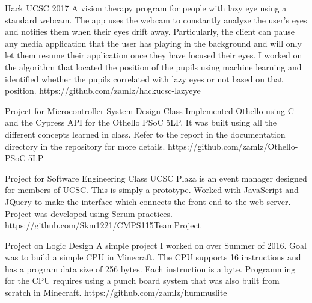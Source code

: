 \documentclass{cv}
\begin{document}
\begin{adjustwidth}{0.5cm}{0.5cm}
{Hack UCSC 2017}
{A vision therapy program for people with lazy eye using a standard
webcam. The app uses the webcam to constantly analyze the user's eyes
and notifies them when their eyes drift away. Particularly, the client
can pause any media application that the user has playing in the
background and will only let them resume their application once they
have focused their eyes. I worked on the algorithm that located the
position of the pupils using machine learning and identified whether
the pupils correlated with lazy eyes or not based on that position.}
{https://github.com/zamlz/hackucsc-lazyeye}

{Project for Microcontroller System Design Class}
{Implemented Othello using C and the Cypress API for the Othello PSoC 5LP.
It was built using all the different concepts learned in class. Refer to the
report in the documentation directory in the repository for more details.}
{https://github.com/zamlz/Othello-PSoC-5LP}

{Project for Software Engineering Class}
{UCSC Plaza is an event manager designed for members of UCSC. This is simply
a prototype. Worked with JavaScript and JQuery to make the interface which
connects the front-end to the web-server. Project was developed using Scrum
practices.}
{https://github.com/Skm1221/CMPS115TeamProject}

{Project on Logic Design}
{A simple project I worked on over Summer of 2016. Goal was to build a simple
CPU in Minecraft. The CPU supports 16 instructions and has a program data
size of 256 bytes. Each instruction is a byte. Programming for the CPU
requires using a punch board system that was also built from scratch in
Minecraft.}
{https://github.com/zamlz/hummuslite}
\end{adjustwidth}



\end{document}
